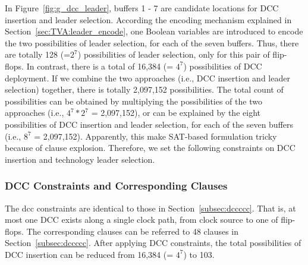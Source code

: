 In Figure~\ref{fig:g_dcc_leader}, buffers 1 - 7 are candidate locations for DCC insertion and leader selection. According the encoding mechanism explained in Section~\ref{sec:TVA:leader_encode}, one Boolean variables are introduced to encode the two possibilities of leader selection, for each of the seven buffers. Thus, there are totally 128 (=$2^7$) possibilities of leader selection, only for this pair of flip-flops. In contrast, there is a total of 16,384 (= $4^7$) possibilities of DCC  deployment. If we combine the two approaches (i.e., DCC insertion and leader selection) together, there is totally 2,097,152 possibilities. The total count of possibilities can be obtained by multiplying the possibilities of the two approaches (i.e., $4^7*2^7$ = 2,097,152), or can be explained by the eight possibilities of DCC insertion and leader selection, for each of the seven buffers (i.e., $8^7$ = 2,097,152). Apparently, this make SAT-based formulation tricky because of clause explosion. Therefore, we set the following constraints on DCC insertion and technology leader selection.

\subsubsection{DCC Constraints and Corresponding Clauses}
\label{sec:TVA:dcc_c}
The dcc constraints are identical to those in Section~\ref{subsec:dccccc}. That is, at most one DCC exists along a single clock path, from clock source to one of flip-flops. The corresponding clauses can be referred to 48 clauses in Section~\ref{subsec:dccccc}. After applying DCC constraints, the total possibilities of DCC insertion can be reduced from 16,384 (= $4^7$) to 103. 

